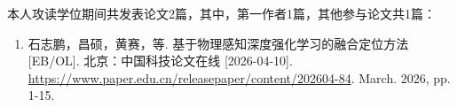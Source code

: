 \begin{publication}
\newcommand{\IF}[1]{\textcolor{Maroon}{IF = #1}}
本人攻读学位期间共发表论文2篇，其中，第一作者1篇，其他参与论文共1篇：
\begin{enumerate}
\item 石志鹏，昌硕，黄赛，等. 基于物理感知深度强化学习的融合定位方法[EB/OL]. 北京：中国科技论文在线 [2026-04-10].\\
\url{https://www.paper.edu.cn/releasepaper/content/202604-84}. March. 2026, pp. 1-15.
\end{enumerate}




\end{publication}
\clearpage
\thispagestyle{empty}
\mbox{}
\clearpage
